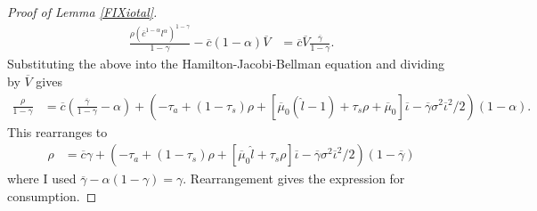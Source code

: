 \documentclass[11pt]{article}
\theoremstyle{plain}
\begin{document}
\begin{proof}[Proof of Lemma \ref{FIXiotal}]
\begin{align*}
\frac{\rho(\overline{c}^{1-\alpha}l^{\alpha})^{1-\gamma}}{1-\gamma} - \overline{c}(1-\alpha)\overline{V} & %
= \overline{c}\overline{V}\frac{\overline{\gamma}}{1-\gamma}.
\end{align*}
Substituting the above into the Hamilton-Jacobi-Bellman equation and dividing by $\overline{V}$ gives
\begin{align*}
\frac{\rho}{1-\gamma} & = \overline{c}{\left(\frac{\overline{\gamma}}{1-\gamma} -\alpha \right)} + {\left( -\tau_a + (1-\tau_s)\rho + [\overline{\mu}_0(\hat{l} - 1) + \tau_s\rho + \overline{\mu}_0]\overline{\iota} - \overline{\gamma}\sigma^2\overline{\iota}^2/2\right)}(1-\alpha).
\end{align*}
This rearranges to
\begin{align*}
\rho & = \overline{c}\gamma + {\left( -\tau_a + (1-\tau_s)\rho + [\overline{\mu}_0\hat{l} + \tau_s\rho]\overline{\iota} - \overline{\gamma}\sigma^2\overline{\iota}^2/2\right)}(1-\overline{\gamma})
\end{align*} %
where I used $\overline{\gamma} - \alpha(1-\gamma) = \gamma$. Rearrangement gives the expression for consumption.
\end{proof}
\end{document}
